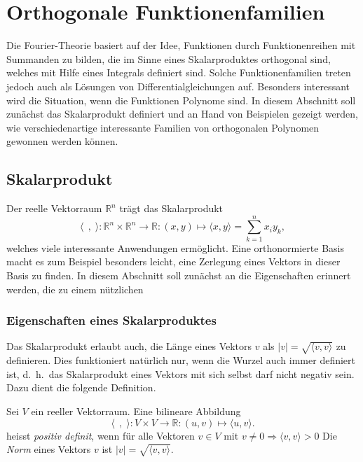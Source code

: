 %
%
%
\section{Orthogonale Funktionenfamilien
\label{buch:orthogonalitaet:section:orthogonale-funktionen}}
Die Fourier-Theorie basiert auf der Idee, Funktionen durch 
Funktionenreihen mit Summanden zu bilden, die im Sinne eines
Skalarproduktes orthogonal sind, welches mit Hilfe eines Integrals
definiert sind.
Solche Funktionenfamilien treten jedoch auch als Lösungen von
Differentialgleichungen auf.
Besonders interessant wird die Situation, wenn die Funktionen 
Polynome sind.
In diesem Abschnitt soll zunächst das Skalarprodukt definiert 
und an Hand von Beispielen gezeigt werden, wie verschiedenartige
interessante Familien von orthogonalen Polynomen gewonnen werden
können.

%
%
\subsection{Skalarprodukt}
Der reelle Vektorraum $\mathbb{R}^n$ trägt das Skalarprodukt
\[
\langle\;\,,\;\rangle
\colon
\mathbb{R}^n \times \mathbb{R}^n \to \mathbb{R}
:
(x,y)\mapsto \langle x, y\rangle = \sum_{k=1}^n x_iy_k,
\]
welches viele interessante Anwendungen ermöglicht.
Eine orthonormierte Basis macht es zum Beispiel besonders leicht,
eine Zerlegung eines Vektors in dieser Basis zu finden.
In diesem Abschnitt soll zunächst an die Eigenschaften erinnert
werden, die zu einem nützlichen 

\subsubsection{Eigenschaften eines Skalarproduktes}
Das Skalarprodukt erlaubt auch, die Länge eines Vektors $v$
als $|v| = \sqrt{\langle v,v\rangle}$ zu definieren.
Dies funktioniert natürlich nur, wenn die Wurzel auch immer
definiert ist, d.~h.~das Skalarprodukt eines Vektors mit sich
selbst darf nicht negativ sein.
Dazu dient die folgende Definition.

\begin{definition}
Sei $V$ ein reeller Vektorraum.
Eine bilineare Abbildung
\[
\langle\;\,,\;\rangle
\colon
V\times V
\to
\mathbb{R}
:
(u,v) \mapsto \langle u,v\rangle.
\]
heisst {\em positiv definit}, wenn für alle Vektoren $v \in V$ mit
$v\ne 0 \Rightarrow \langle v,v\rangle > 0$ 
Die {\em Norm} eines Vektors $v$ ist
$|v|=\sqrt{\langle v,v\rangle}$.
\end{definition}

